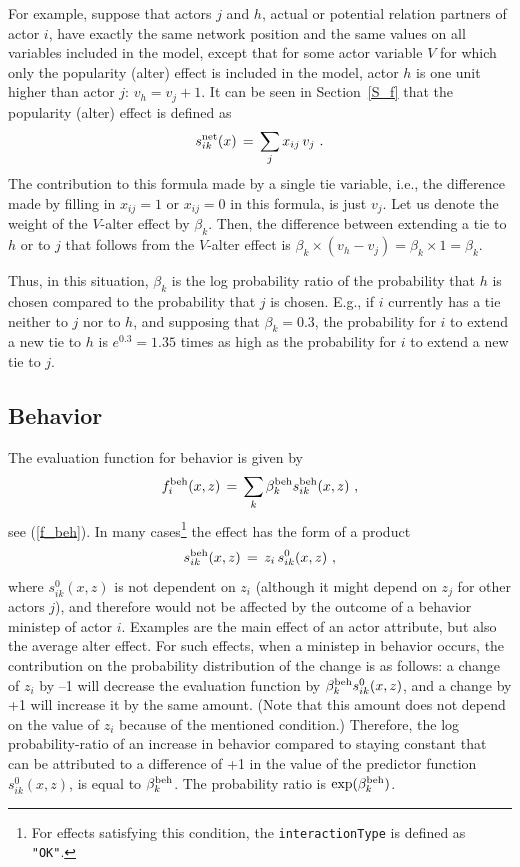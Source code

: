 \documentclass[a4paper,fleqn,11pt]{article}
\newcommand{\+}{\, + \,}
\begin{document}
For example, suppose that actors $j$ and $h$,
actual or potential relation partners of actor $i$,
have exactly the same network
position and the same values on all variables included in the model,
except that for some actor variable $V$ for which only the
popularity (alter) effect is included in the model,
actor $h$ is one unit higher than actor $j$: $v_h = v_j + 1$.
It can be seen in Section~\ref{S_f} that
the popularity (alter) effect is defined as
\[
s^{\rm net}_{ik}(x) \, = \,  \sum_j x_{ij}\, v_j \ .
\]
The contribution to this formula made by a single tie variable,
i.e., the difference made by filling in $x_{ij} = 1$ or $x_{ij} = 0$
in this formula, is just $v_j$.
Let us denote the weight of the $V$-alter effect by $\beta_k$.
Then, the difference between extending a tie to $h$ or to $j$
that follows from the $V$-alter effect is
$\beta_k \times (v_h - v_j) = \beta_k \times 1 = \beta_k$.

Thus, in this situation, $\beta_k$ is the log probability ratio of the probability
that $h$ is chosen compared to the probability that $j$ is chosen.
E.g., if $i$ currently has a tie neither to $j$ nor to $h$,
and supposing that $\beta_k = 0.3$, the probability for $i$ to
extend a new tie to $h$ is $e^{0.3} = 1.35$ times as high
as the probability for $i$ to extend a new tie to $j$.

\subsection{Behavior}

The evaluation function for behavior is given by
\[
f^{\rm beh}_i(x, z) \, = \, \sum_k \beta^{\rm beh}_k s^{\rm beh}_{ik}(x, z) \ ,
\]
see (\ref{f_beh}).
In many cases\footnote{For effects satisfying this condition,
the \texttt{interactionType} is defined as \texttt{"OK"}.}
the effect has the form of a product
\begin{equation}
s^{\rm beh}_{ik}(x, z) \,=\, z_i \,s^{0}_{ik}(x, z) \ ,  \label{beh_generic}
\end{equation}
where $s^{0}_{ik}(x, z)$ is not dependent on $z_i$
(although it might depend on $z_j$ for other actors $j$), and therefore
would not be affected by the outcome of a behavior ministep of actor $i$.
Examples are the main effect of an actor attribute, but also the
average alter effect.
For such effects,
when a ministep in behavior occurs, the contribution
on the probability distribution of the change is as follows:
a change of $z_i $ by --1 will decrease the evaluation function by
$\beta^{\rm beh}_k s^{0}_{ik}(x, z)$,
and a change by +1 will increase it by the same amount.
(Note that this amount does not depend on the value of $z_i$
because of the mentioned condition.)
Therefore, the log probability-ratio of an increase in behavior compared to
staying constant that can be attributed to a difference of +1 in the
value of the predictor function $s^{0}_{ik}(x, z)$, is equal to
$\beta^{\rm beh}_k$. The probability ratio is $\exp(\beta^{\rm beh}_k)$.
\end{document}
